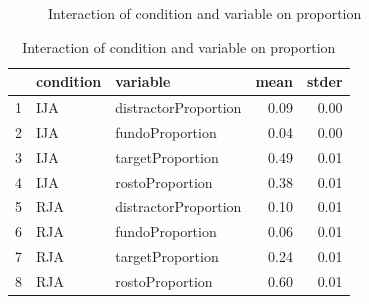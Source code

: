 \documentclass{article}
\begin{document}
\begin{figure}[H]
  \caption{Interaction of condition and variable on proportion}
  \noindent{}
  \centering
\end{figure}

\begin{table}[ht]
\centering
\caption{Interaction of condition and variable on proportion}
\begin{tabular}{rllrr}
  \hline
 & condition & variable & mean & stder \\ 
  \hline
1 & IJA & distractorProportion & 0.09 & 0.00 \\ 
  2 & IJA & fundoProportion & 0.04 & 0.00 \\ 
  3 & IJA & targetProportion & 0.49 & 0.01 \\ 
  4 & IJA & rostoProportion & 0.38 & 0.01 \\ 
  5 & RJA & distractorProportion & 0.10 & 0.01 \\ 
  6 & RJA & fundoProportion & 0.06 & 0.01 \\ 
  7 & RJA & targetProportion & 0.24 & 0.01 \\ 
  8 & RJA & rostoProportion & 0.60 & 0.01 \\ 
   \hline
\end{tabular}
\end{table}
\end{document}
